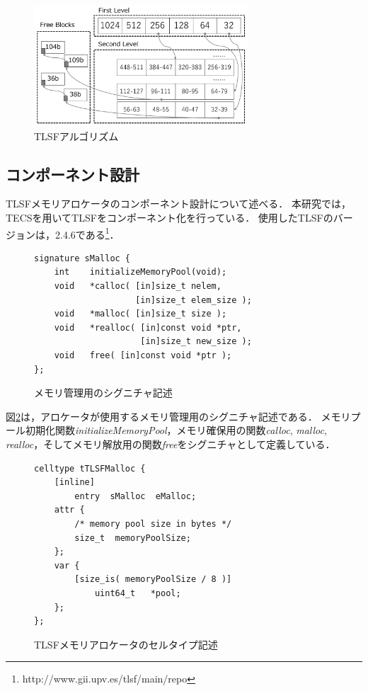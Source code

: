 \documentclass[submit,techrep]{ipsj_v2/UTF8/ipsj}
\begin{document}
\begin{figure}[t]
    \centering
    \includegraphics[width=8cm,clip]{figure/TLSF.pdf}
    \caption{TLSFアルゴリズム}
    \label{fig:TLSF}
\end{figure}


\subsection{コンポーネント設計}

TLSFメモリアロケータのコンポーネント設計について述べる．
本研究では，TECSを用いてTLSFをコンポーネント化を行っている．
使用したTLSFのバージョンは，2.4.6である\footnote{http://www.gii.upv.es/tlsf/main/repo}．

\begin{figure}[t]
\centering
\begin{lstlisting}
signature sMalloc {
    int    initializeMemoryPool(void);
    void   *calloc( [in]size_t nelem,
                    [in]size_t elem_size );
    void   *malloc( [in]size_t size );
    void   *realloc( [in]const void *ptr,
                     [in]size_t new_size );
    void   free( [in]const void *ptr );
};
\end{lstlisting}
\caption{メモリ管理用のシグニチャ記述}  
\label{src:TLSFSignature}
\end{figure}


図\ref{src:TLSFSignature}は，アロケータが使用するメモリ管理用のシグニチャ記述である．
メモリプール初期化関数{\it initializeMemoryPool}，メモリ確保用の関数{\it calloc}, {\it malloc}, {\it realloc}，そしてメモリ解放用の関数{\it free}をシグニチャとして定義している．

\begin{figure}[t]
\centering
\begin{lstlisting}
celltype tTLSFMalloc {
    [inline]
        entry  sMalloc  eMalloc;
    attr {
        /* memory pool size in bytes */
        size_t  memoryPoolSize;
    };
    var {
        [size_is( memoryPoolSize / 8 )]
            uint64_t   *pool;
    };
};
\end{lstlisting}
\caption{TLSFメモリアロケータのセルタイプ記述}  
\label{src:TLSFCelltype}
\end{figure}
\end{document}
